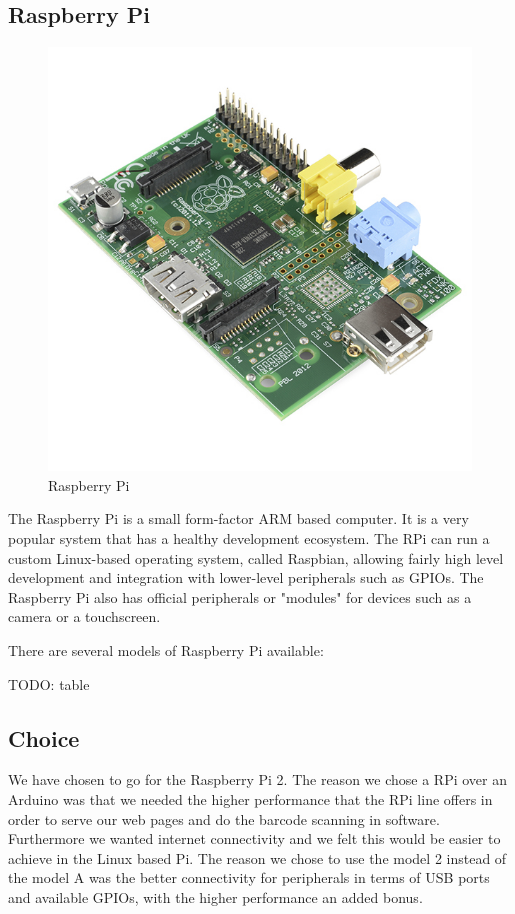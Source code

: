 \documentclass[10pt]{article}
\begin{document}
\subsection{Raspberry Pi}

\begin{figure}[h]
\centering
\caption{Raspberry Pi}
\label{Raspberry Pi}
\includegraphics[scale=.5]{images/Raspberry-Pi.jpg}
\end{figure}
The Raspberry Pi is a small form-factor ARM based computer. It is a very popular system that has a healthy development ecosystem. The RPi can run a custom Linux-based operating system, called Raspbian, allowing fairly high level development and integration with lower-level peripherals such as GPIOs. The Raspberry Pi also has official peripherals or "modules" for devices such as a camera or a touchscreen.

There are several models of Raspberry Pi available:

TODO: table

\subsection{Choice}
We have chosen to go for the Raspberry Pi 2. The reason we chose a RPi over an Arduino was that we needed the higher performance that the RPi line offers in order to serve our web pages and do the barcode scanning in software. Furthermore we wanted internet connectivity and we felt this would be easier to achieve in the Linux based Pi. The reason we chose to use the model 2 instead of the model A was the better connectivity for peripherals in terms of USB ports and available GPIOs, with the higher performance an added bonus.
\end{document}
